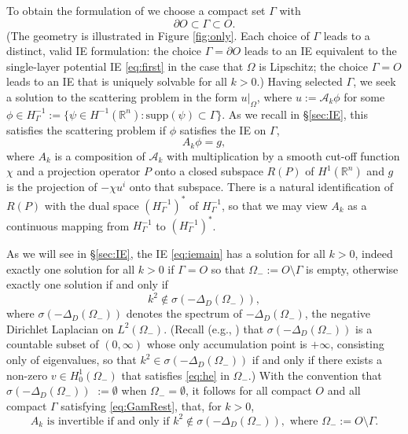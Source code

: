 \documentclass{birkjour}
\theoremstyle{definition}
\theoremstyle{remark}
\numberwithin{equation}{section}
\newcommand{\R}{\mathbb{R}}
\newcommand{\cA}{\mathcal{A}}
\newcommand{\supp}{\mathrm{supp}}
\begin{document}
To obtain the formulation of \cite{caetano2025integral} we choose a compact set $\Gamma$ with
\begin{equation} \label{eq:GamRest}
\partial O \subset \Gamma \subset O.
\end{equation}
(The geometry is illustrated in Figure \ref{fig:only}. Each choice of $\Gamma$ leads to a distinct, valid IE formulation: the choice $\Gamma = \partial O$ leads to an IE equivalent to the single-layer potential IE \eqref{eq:first} in the case that $\Omega$ is Lipschitz; the choice $\Gamma=O$ leads to an IE that is uniquely solvable for all $k>0$.) Having selected $\Gamma$, we
seek a solution to the scattering problem in the form $u|_\Omega$, where $u:=\cA_k\phi$ for some $\phi\in H^{-1}_\Gamma:= \{\psi\in H^{-1}(\R^n):\supp(\psi)\subset \Gamma\}$. As we recall in  \S\ref{sec:IE}, %
this satisfies the scattering problem if $\phi$ satisfies the IE on $\Gamma$,
\begin{equation} \label{eq:iemain}
A_k\phi = g,
\end{equation}
where $A_k$ is a composition of $\cA_k$ with multiplication by a smooth cut-off function $\chi$ and a projection operator $P$ onto a closed subspace $R(P)$ of $H^1(\R^n)$ and $g$ is the projection of $-\chi u^i$ onto that subspace. There is a natural identification of $R(P)$ with the dual space $(H_\Gamma^{-1})^*$ of $H_\Gamma^{-1}$, so that we may view $A_k$ as a continuous mapping from $H^{-1}_\Gamma$ to $(H_\Gamma^{-1})^*$. 

As we will see in \S\ref{sec:IE}, %
 the IE \eqref{eq:iemain} has a solution for all $k>0$, indeed \cite{caetano2025integral} exactly one solution for all $k>0$ if $\Gamma=O$ so that $\Omega_-:= O\setminus \Gamma$ is empty, otherwise exactly one solution if and only if
\begin{equation} \label{eq:SigmaDef}
k^2\not\in \sigma(-\Delta_D(\Omega_-)),
\end{equation}
where $\sigma(-\Delta_D(\Omega_-))$ denotes the spectrum of $-\Delta_D(\Omega_-)$, the negative Dirichlet Laplacian on $L^2(\Omega_-)$.  (Recall (e.g., \cite{levitin2023topics}) that  $\sigma(-\Delta_D(\Omega_-))$ is a countable subset of $(0,\infty)$  whose only accumulation point is $+\infty$, consisting only of eigenvalues, so that $k^2\in \sigma(-\Delta_D(\Omega_-))$ if and only if there exists a non-zero $v\in H_0^1(\Omega_-)$ that satisfies \eqref{eq:he} in $\Omega_-$.) With the convention that $ \sigma(-\Delta_D(\Omega_-))$ $:= \emptyset$ when $\Omega_-=\emptyset$, it follows for all compact $O$ and all compact $\Gamma$ satisfying  \eqref{eq:GamRest}, that, for $k>0$,
\begin{equation} \label{eq:invert}
A_k \mbox{ is invertible if and only if } k^2\not\in \sigma(-\Delta_D(\Omega_-)), \mbox{ where } \Omega_-:= O\setminus \Gamma.
\end{equation}
\end{document}
